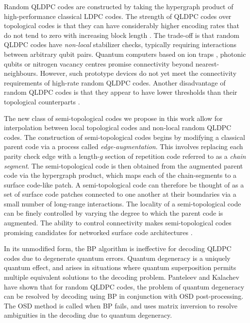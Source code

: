 \documentclass[%
 reprint,
superscriptaddress,
nofootinbib,
 amsmath,amssymb,
secnumarabic
]{revtex4-1}
\begin{document}
Random QLDPC codes are constructed by taking the hypergraph product of high-performance classical LDPC codes. The strength of QLDPC codes over topological codes is that they can have considerably higher encoding rates that  do not tend to zero with increasing block length \cite{leverrier2015quantum,fawzi2018constant,fawzi2018efficient}. The trade-off is that random QLDPC codes have \textit{non-local} stabilizer checks, typically requiring interactions between arbitrary qubit pairs. Quantum computers based on ion traps \cite{Randall15,Debnath16,Brandl16,Ballance16}, photonic qubits \cite{Qiang18,Wang2016} or nitrogen vacancy centres \cite{wu2019programmable} promise connectivity beyond nearest-neighbours. However, such prototype devices do not yet meet the connectivity requirements of high-rate random QLDPC codes. Another disadvantage of random QLDPC codes is that they appear to have lower thresholds than their topological counterparts \cite{grospellier2018numerical,kovalev2018numerical,liu2019neural,Panteleev_2019,grospellier2020combining}. 

The new class of semi-topological codes we propose in this work allow for interpolation between local topological codes and non-local random QLDPC codes. The construction of semi-topological codes begins by modifying a classical parent code via a process called \textit{edge-augmentation}. This involves replacing each parity check edge with a length-$g$ section of repetition code referred to as a \textit{chain segment}. The semi-topological code is then obtained from the augmented parent code via the hypergraph product, which maps each of the chain-segments to a surface code-like patch. A semi-topological code can therefore be thought of as a set of surface code patches connected to one another at their boundaries via a small number of long-range interactions. The locality of a semi-topological code can be finely controlled by varying the degree to which the parent code is augmented. The ability to control connectivity makes semi-topological codes promising candidates for networked surface code architectures \cite{Nickerson14}.


In its unmodified form, the BP algorithm is ineffective for decoding QLDPC codes due to degenerate quantum errors. Quantum degeneracy is a uniquely quantum effect, and arises in situations where quantum superposition permits multiple equivalent solutions to the decoding problem. Panteleev and Kalachev \cite{Panteleev_2019} have shown that for random QLDPC codes, the problem of quantum degeneracy can be resolved by decoding using BP in conjunction with OSD post-processing. The OSD method is called when BP fails, and uses matrix inversion to resolve ambiguities in the decoding due to quantum degeneracy. 
\end{document}
